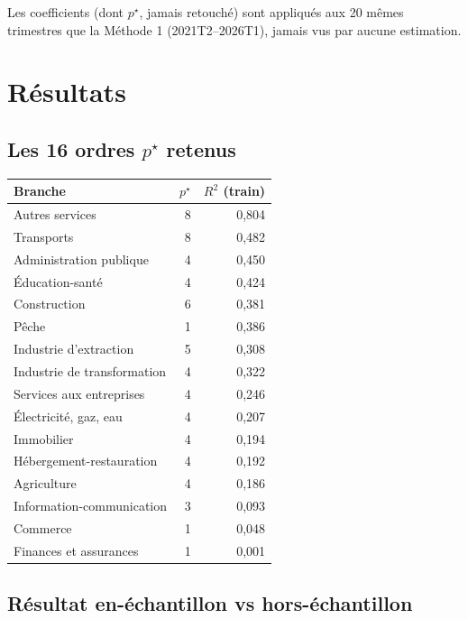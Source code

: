 \documentclass[11pt,a4paper]{article}
\begin{document}
Les coefficients (dont $p^\star$, jamais retouché) sont appliqués aux 20 mêmes trimestres que la Méthode 1 (2021T2--2026T1), jamais vus par aucune estimation.

\section{Résultats}

\subsection{Les 16 ordres $p^\star$ retenus}

\begin{center}
\small
\begin{tabular}{lrr}
\toprule
\textbf{Branche} & \textbf{$p^\star$} & \textbf{$R^2$ (train)} \\
\midrule
Autres services & 8 & 0,804 \\
Transports & 8 & 0,482 \\
Administration publique & 4 & 0,450 \\
Éducation-santé & 4 & 0,424 \\
Construction & 6 & 0,381 \\
Pêche & 1 & 0,386 \\
Industrie d'extraction & 5 & 0,308 \\
Industrie de transformation & 4 & 0,322 \\
Services aux entreprises & 4 & 0,246 \\
Électricité, gaz, eau & 4 & 0,207 \\
Immobilier & 4 & 0,194 \\
Hébergement-restauration & 4 & 0,192 \\
Agriculture & 4 & 0,186 \\
Information-communication & 3 & 0,093 \\
Commerce & 1 & 0,048 \\
Finances et assurances & 1 & 0,001 \\
\bottomrule
\end{tabular}
\end{center}

\subsection{Résultat en-échantillon vs hors-échantillon}
\end{document}
